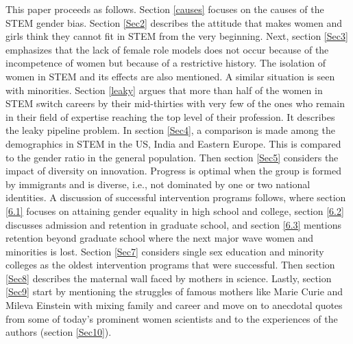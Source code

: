 \documentclass[utf8]{frontiersSCNS} %
\begin{document}
This paper proceeds as follows. Section \ref{causes} focuses on the causes of the STEM gender bias. Section \ref{Sec2} describes the attitude that makes women and girls think they cannot fit in STEM from the very beginning. Next, section \ref{Sec3} emphasizes that the lack of female role models does not occur because of the incompetence of women but because of a restrictive history. The isolation of women in STEM and its effects are also mentioned. A similar situation is seen with minorities. Section \ref{leaky} argues that more than half of the women in STEM switch careers by their mid-thirties with very few of the ones who remain in their field of expertise reaching the top level of their profession. It describes the leaky pipeline problem. In section \ref{Sec4}, a comparison is made among the demographics in STEM in the US, India and Eastern Europe.  This is compared to the gender ratio in the general population. Then section \ref{Sec5} considers the impact of diversity on innovation. Progress is optimal when the group is formed by immigrants and is diverse, i.e., not dominated by one or two national identities. A discussion of successful intervention programs follows, where section \ref{6.1} focuses on attaining gender equality in high school and college, section \ref{6.2} discusses admission and retention in graduate school, and section \ref{6.3} mentions retention beyond graduate school where the next major wave women and minorities is lost. Section \ref{Sec7} considers single sex education and minority colleges as the oldest intervention programs that were successful. Then section \ref{Sec8} describes the maternal wall faced by mothers in science. Lastly, section \ref{Sec9} start by mentioning the struggles of famous mothers like Marie Curie and Mileva Einstein with mixing family and career and move on to anecdotal quotes from some of today's prominent women scientists and to the experiences of the authors (section \ref{Sec10}).

\end{document}
